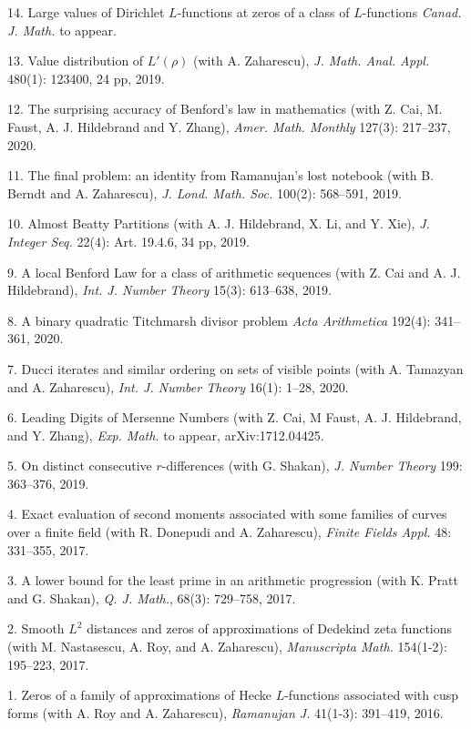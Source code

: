 \documentclass[margin,line,pifont,palatino,courier]{res}
\begin{document}
\begin{resume}
14. {Large values of Dirichlet $L$-functions at zeros of a class of $L$-functions} {\it Canad. J. Math.} to appear.

13. {Value distribution of $L'(\rho)$} (with A. Zaharescu), {{\it J. Math. Anal. Appl.} 480(1): 123400, 24 pp, 2019.}

12. {The surprising accuracy of Benford's law in mathematics} (with Z. Cai, M. Faust, A. J. Hildebrand and Y. Zhang), {\it Amer. Math. Monthly}  127(3): 217--237, 2020. 

11. {The final problem: an identity from Ramanujan's lost notebook} (with B. Berndt and A. Zaharescu), {\it J. Lond. Math. Soc.} 100(2): 568--591, 2019.

10. {Almost Beatty Partitions} (with A. J. Hildebrand, X. Li, and Y. Xie), {{\it J. Integer Seq.} 22(4): Art. 19.4.6, 34 pp, 2019.}

9. {A local Benford Law for a class of arithmetic sequences} (with Z. Cai and A. J. Hildebrand), {\it Int. J. Number Theory} 15(3): 613--638, 2019.

8. {A binary quadratic Titchmarsh divisor problem}
{\it Acta Arithmetica} 192(4): 341--361, 2020. %

7. {Ducci iterates and similar ordering on sets of visible points} (with A. Tamazyan and A. Zaharescu), {{\it Int. J. Number Theory} 16(1): 1--28, 2020.}

6. {Leading Digits of Mersenne Numbers} (with Z. Cai, M Faust, A. J. Hildebrand, and Y. Zhang), {\it Exp. Math.} to appear,  arXiv:1712.04425.

5. {On distinct consecutive $r$-differences} (with G. Shakan), {\it J. Number Theory} 199: 363--376, 2019.

4. {Exact evaluation of second moments associated with some families of
	curves over a finite field} (with R. Donepudi and A. Zaharescu), {\it Finite Fields Appl.} 48: 331--355, 2017.

3. {A lower bound for the least prime in an arithmetic progression} (with K. Pratt and G. Shakan), {\it Q. J. Math.}, 68(3): 729--758,
2017.

2. {Smooth {$L^2$} distances and zeros of approximations of {D}edekind
	zeta functions} (with M. Nastasescu, A. Roy, and A. Zaharescu), {\it Manuscripta Math.} 154(1-2): 195--223, 2017.

1. {Zeros of a family of approximations of {H}ecke {$L$}-functions
associated with cusp forms} (with A. Roy and A. Zaharescu), {\it Ramanujan J.} 41(1-3): 391--419, 2016.


\end{resume}
\end{document}
